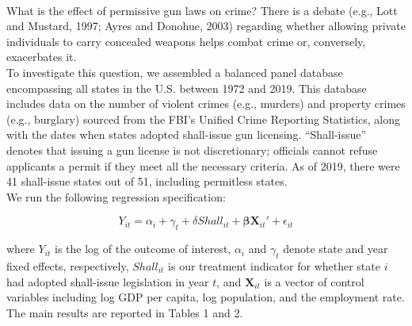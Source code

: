 \documentclass{article}
\begin{document}
\newpage
{}\\[2em]

What is the effect of permissive gun laws on crime? There is a debate (e.g., Lott and Mustard, 1997; Ayres and Donohue, 2003) regarding whether allowing private individuals to carry concealed weapons helps combat crime or, conversely, exacerbates it.\\

To investigate this question, we assembled a balanced panel database encompassing all states in the U.S. between 1972 and 2019. This database includes data on the number of violent crimes (e.g., murders) and property crimes (e.g., burglary) sourced from the FBI's Unified Crime Reporting Statistics, along with the dates when states adopted shall-issue gun licensing. ``Shall-issue'' denotes that issuing a gun license is not discretionary; officials cannot refuse applicants a permit if they meet all the necessary criteria. As of 2019, there were 41 shall-issue states out of 51, including permitless states. \\

We run the following regression specification:

\begin{equation*}
    Y_{it} = \alpha_i + \gamma_t + {\delta} Shall_{it} + \mathbf{{\beta}}\textbf{X}_{it}'+\epsilon_{it}
\end{equation*}
    
where $Y_{it}$ is the log of the outcome of interest, $\alpha_i$ and $\gamma_t$ denote state and year fixed effects, respectively, $Shall_{it}$ is our treatment indicator for whether state $i$ had adopted shall-issue legislation in year $t$, and $\textbf{X}_{it}$ is a vector of control variables including log GDP per capita, log population, and the employment rate.\\

The main results are reported in Tables 1 and 2.\\
\end{document}
